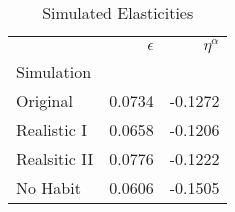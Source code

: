 \begin{table}
\centering
\caption{Simulated Elasticities}
\label{tab:elasts}
\begin{tabular}{lrr}
\toprule
{} & $\epsilon$ & $\eta^{\alpha}$ \\
Simulation   &            &                 \\
\midrule
Original     &     0.0734 &         -0.1272 \\
Realistic I  &     0.0658 &         -0.1206 \\
Realsitic II &     0.0776 &         -0.1222 \\
No Habit     &     0.0606 &         -0.1505 \\
\bottomrule
\end{tabular}
\end{table}
